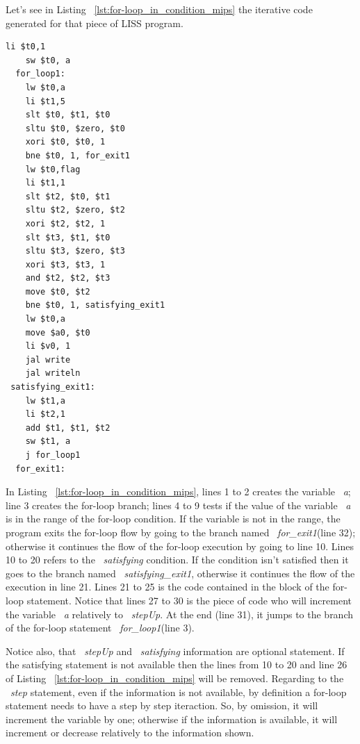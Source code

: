 \documentclass[
  oneside,
  11pt, a4paper,
  footinclude=true,
  headinclude=true,
  cleardoublepage=empty
]{scrbook}
\begin{document}
Let's see in Listing ~\ref{lst:for-loop_in_condition_mips} the iterative code generated for that piece of LISS program.

\begin{lstlisting}[caption={Iterative code generated for the LISS program in Listing ~\ref{lst:for-loop_in_condition_LISS}},label={lst:for-loop_in_condition_mips}]
    li $t0,1		
    sw $t0, a		
  for_loop1:
    lw $t0,a		
    li $t1,5		
    slt $t0, $t1, $t0	
    sltu $t0, $zero, $t0	
    xori $t0, $t0, 1	
    bne $t0, 1, for_exit1		
    lw $t0,flag		
    li $t1,1		
    slt $t2, $t0, $t1	
    sltu $t2, $zero, $t2	
    xori $t2, $t2, 1	
    slt $t3, $t1, $t0	
    sltu $t3, $zero, $t3	
    xori $t3, $t3, 1	
    and $t2, $t2, $t3	
    move $t0, $t2		
    bne $t0, 1, satisfying_exit1		
    lw $t0,a		
    move $a0, $t0		
    li $v0, 1
    jal write		
    jal writeln		
 satisfying_exit1:
    lw $t1,a		
    li $t2,1		
    add $t1, $t1, $t2	
    sw $t1, a		
    j for_loop1		
  for_exit1:
\end{lstlisting}

In Listing ~\ref{lst:for-loop_in_condition_mips}, lines 1 to 2 creates the variable ~\textit{a}; line 3 creates the for-loop branch; lines 4 to 9 tests if the value of the variable ~\textit{a} is in the range of the for-loop condition. If the variable is not in the range, the program exits the for-loop flow by going to the branch named ~\textit{for\_exit1}(line 32); otherwise it continues the flow of the for-loop execution by going to line 10. Lines 10 to 20 refers to the ~\textit{satisfying} condition. If the condition isn't satisfied then it goes to the branch named ~\textit{satisfying\_exit1}, otherwise it continues the flow of the execution in line 21. Lines 21 to 25 is the code contained in the block of the for-loop statement. Notice that lines 27 to 30 is the piece of code who will increment the variable ~\textit{a} relatively to ~\textit{stepUp}. At the end (line 31), it jumps to the branch of the for-loop statement ~\textit{for\_loop1}(line 3).

Notice also, that ~\textit{stepUp} and ~\textit{satisfying} information are optional statement. If the satisfying statement is not available then the lines from 10 to 20 and line 26 of Listing ~\ref{lst:for-loop_in_condition_mips} will be removed. Regarding to the ~\textit{step} statement, even if the information is not available, by definition a for-loop statement needs to have a step by step iteraction. So, by omission, it will increment the variable by one; otherwise if the information is available, it will increment or decrease relatively to the information shown.
\end{document}
